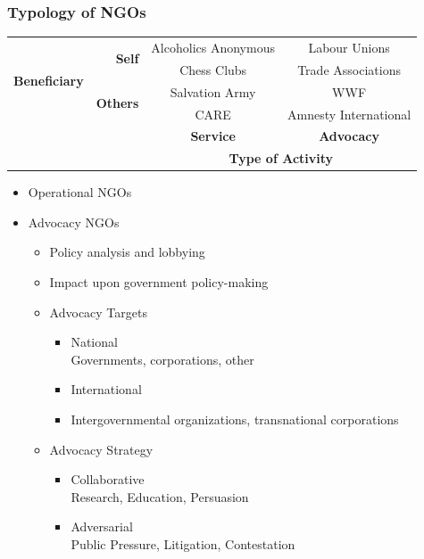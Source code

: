 \documentclass[11pt]{article}
\theoremstyle{definition}
\begin{document}
\subsubsection{Typology of NGOs}
\begin{tabularx}{\linewidth}{r r |c|c|}
	\multirow{4}{*}{\large\textbf{Beneficiary}} & \multirow{2}{*}{\textbf{Self}} & Alcoholics Anonymous & Labour Unions\\
	& & Chess Clubs & Trade Associations\\
	\cline{2-4}
	& \multirow{2}{*}{\textbf{Others}} & Salvation Army & WWF\\
	& & CARE & Amnesty International\\
	\cline{2-4}
	& & \textbf{Service} & \textbf{Advocacy}\\
	\multicolumn{2}{c}{} & \multicolumn{2}{c}{\large \textbf{Type of Activity}}
\end{tabularx}
\begin{itemize}
	\item Operational NGOs
	\item Advocacy NGOs
	\begin{itemize}
		\item Policy analysis and lobbying
		\item Impact upon government policy-making
		\item Advocacy Targets
		\begin{itemize}
			\item National\\
			Governments, corporations, other
			\item International
			\item Intergovernmental organizations, transnational corporations
		\end{itemize}
		\item Advocacy Strategy
		\begin{itemize}
			\item Collaborative\\
			Research, Education, Persuasion
			\item Adversarial\\
			Public Pressure, Litigation, Contestation
		\end{itemize}
	\end{itemize}
\end{itemize}
\end{document}
